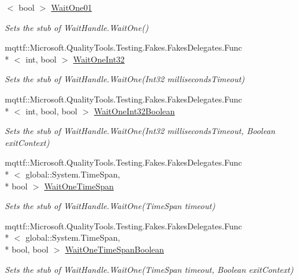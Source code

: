 \begin{DoxyCompactItemize}
$<$ bool $>$ \hyperlink{class_system_1_1_threading_1_1_fakes_1_1_stub_event_wait_handle_a558adc7bb597472cc62f452f4394454b}{Wait\-One01}
\begin{DoxyCompactList}\small\item\em Sets the stub of Wait\-Handle.\-Wait\-One()\end{DoxyCompactList}\item 
mqttf\-::\-Microsoft.\-Quality\-Tools.\-Testing.\-Fakes.\-Fakes\-Delegates.\-Func\\*
$<$ int, bool $>$ \hyperlink{class_system_1_1_threading_1_1_fakes_1_1_stub_event_wait_handle_a1f52552b8f4a62edb713e2fa2a7b74e1}{Wait\-One\-Int32}
\begin{DoxyCompactList}\small\item\em Sets the stub of Wait\-Handle.\-Wait\-One(\-Int32 milliseconds\-Timeout)\end{DoxyCompactList}\item 
mqttf\-::\-Microsoft.\-Quality\-Tools.\-Testing.\-Fakes.\-Fakes\-Delegates.\-Func\\*
$<$ int, bool, bool $>$ \hyperlink{class_system_1_1_threading_1_1_fakes_1_1_stub_event_wait_handle_af1dc29e14bb6f4cf066a2bafee6a6b77}{Wait\-One\-Int32\-Boolean}
\begin{DoxyCompactList}\small\item\em Sets the stub of Wait\-Handle.\-Wait\-One(\-Int32 milliseconds\-Timeout, Boolean exit\-Context)\end{DoxyCompactList}\item 
mqttf\-::\-Microsoft.\-Quality\-Tools.\-Testing.\-Fakes.\-Fakes\-Delegates.\-Func\\*
$<$ global\-::\-System.\-Time\-Span, \\*
bool $>$ \hyperlink{class_system_1_1_threading_1_1_fakes_1_1_stub_event_wait_handle_abba8ea18b569f9dc9a345bac982dc2b0}{Wait\-One\-Time\-Span}
\begin{DoxyCompactList}\small\item\em Sets the stub of Wait\-Handle.\-Wait\-One(\-Time\-Span timeout)\end{DoxyCompactList}\item 
mqttf\-::\-Microsoft.\-Quality\-Tools.\-Testing.\-Fakes.\-Fakes\-Delegates.\-Func\\*
$<$ global\-::\-System.\-Time\-Span, \\*
bool, bool $>$ \hyperlink{class_system_1_1_threading_1_1_fakes_1_1_stub_event_wait_handle_a8bef78f4f9b8a54a7d74310616b0247a}{Wait\-One\-Time\-Span\-Boolean}
\begin{DoxyCompactList}\small\item\em Sets the stub of Wait\-Handle.\-Wait\-One(\-Time\-Span timeout, Boolean exit\-Context)\end{DoxyCompactList}\end{DoxyCompactItemize}
